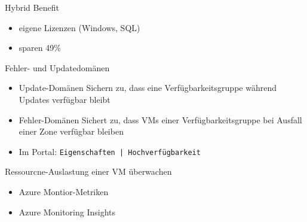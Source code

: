 
\begin{flashcard}[Definition]{Hybrid Benefit}
    \begin{itemize}
        \item eigene Lizenzen (Windows, SQL)
        \item sparen 49\%
    \end{itemize}
\end{flashcard}


\begin{flashcard}[Definition]{Fehler- und Updatedomänen}
    \begin{itemize}
        \item Update-Domänen\newline
            Sichern zu, dass eine Verfügbarkeitsgruppe während Updates verfügbar bleibt
        \item Fehler-Domänen\newline
            Sichert zu, dass VMs einer Verfügbarkeitsgruppe bei Ausfall einer Zone verfügbar bleiben
        \item Im Portal:\newline
            \texttt{Eigenschaften | Hochverfügbarkeit}
    \end{itemize}
\end{flashcard}


\begin{flashcard}[Definition]{Ressourcne-Auslastung einer VM überwachen}
    \begin{itemize}
        \item Azure Montior-Metriken
        \item Azure Monitoring Insights
    \end{itemize}
\end{flashcard}


